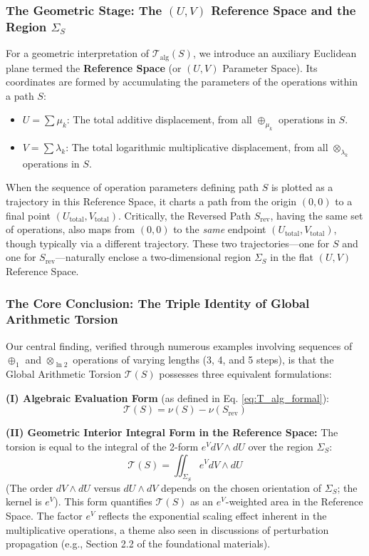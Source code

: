 \subsubsection*{The Geometric Stage: The $(U,V)$ Reference Space and the Region $\Sigma_S$}

For a geometric interpretation of $\mathcal{T}_{\text{alg}}(S)$, we introduce an auxiliary Euclidean plane termed the \textbf{Reference Space} (or $(U,V)$ Parameter Space). Its coordinates are formed by accumulating the parameters of the operations within a path $S$:
\begin{itemize}
    \item $U = \sum \mu_k$: The total additive displacement, from all $\oplus_{\mu_k}$ operations in $S$.
    \item $V = \sum \lambda_k$: The total logarithmic multiplicative displacement, from all $\otimes_{\lambda_k}$ operations in $S$.
\end{itemize}
When the sequence of operation parameters defining path $S$ is plotted as a trajectory in this Reference Space, it charts a path from the origin $(0,0)$ to a final point $(U_{\text{total}}, V_{\text{total}})$. Critically, the Reversed Path $S_{\text{rev}}$, having the same set of operations, also maps from $(0,0)$ to the \textit{same} endpoint $(U_{\text{total}}, V_{\text{total}})$, though typically via a different trajectory. These two trajectories---one for $S$ and one for $S_{\text{rev}}$---naturally enclose a two-dimensional region $\Sigma_S$ in the flat $(U,V)$ Reference Space.

\subsubsection*{The Core Conclusion: The Triple Identity of Global Arithmetic Torsion}

Our central finding, verified through numerous examples involving sequences of $\oplus_1$ and $\otimes_{\ln 2}$ operations of varying lengths (3, 4, and 5 steps), is that the Global Arithmetic Torsion $\mathcal{T}(S)$ possesses three equivalent formulations:

\textbf{(I) Algebraic Evaluation Form} (as defined in Eq. \ref{eq:T_alg_formal}):
\[ \mathcal{T}(S) = \nu(S) - \nu(S_{\text{rev}}) \]

\textbf{(II) Geometric Interior Integral Form in the Reference Space:}
The torsion is equal to the integral of the 2-form $e^V dV \wedge dU$ over the region $\Sigma_S$:
\[ \mathcal{T}(S) = \iint_{\Sigma_S} e^V dV \wedge dU \]
(The order $dV \wedge dU$ versus $dU \wedge dV$ depends on the chosen orientation of $\Sigma_S$; the kernel is $e^V$). This form quantifies $\mathcal{T}(S)$ as an $e^V$-weighted area in the Reference Space. The factor $e^V$ reflects the exponential scaling effect inherent in the multiplicative operations, a theme also seen in discussions of perturbation propagation (e.g., Section 2.2 of the foundational materials).

